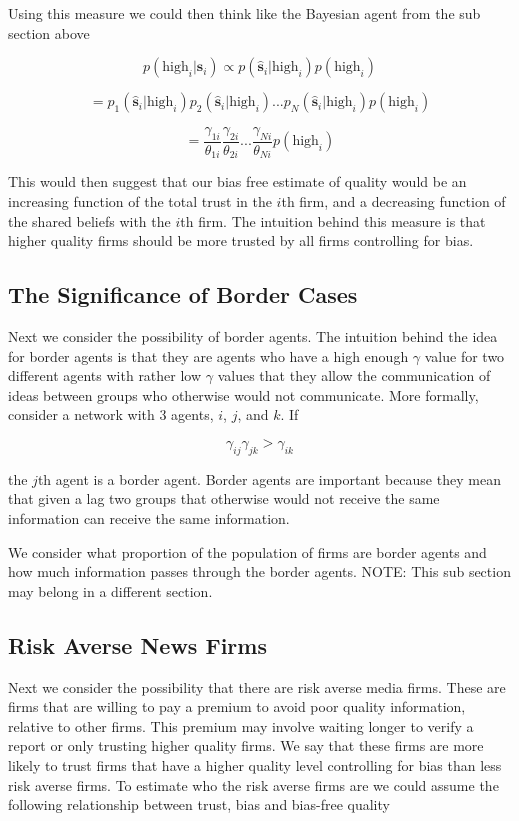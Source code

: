 \documentclass[a4paper]{article}
\begin{document}
Using this measure we could then think like the Bayesian agent from the sub section above

\[p(\text{high}_i|\hat{\textbf{s}}_i) \propto p(\hat{\textbf{s}}_i|\text{high}_i)p(\text{high}_i)\]

\[= p_1(\hat{\textbf{s}}_i|\text{high}_i)p_2(\hat{\textbf{s}}_i|\text{high}_i)...p_N(\hat{\textbf{s}}_i|\text{high}_i)p(\text{high}_i)\]

\[= \frac{\gamma_{1i}}{\theta_{1i}}\frac{\gamma_{2i}}{\theta_{2i}}...\frac{\gamma_{Ni}}{\theta_{Ni}}p(\text{high}_i)\]

This would then suggest that our bias free estimate of quality would be an increasing function of the total trust in the $i$th firm, and a decreasing function of the shared beliefs with the $i$th firm.  The intuition behind this measure is that higher quality firms should be more trusted by all firms controlling for bias.

\subsection{The Significance of Border Cases}

Next we consider the possibility of border agents.  The intuition behind the idea for border agents is that they are agents who have a high enough $\gamma$ value for two different agents with rather low $\gamma$ values that they allow the communication of ideas between groups who otherwise would not communicate.  More formally, consider a network with 3 agents, $i$, $j$, and $k$.  If

\[\gamma_{ij}\gamma_{jk} > \gamma_{ik}\]

the $j$th agent is a border agent.  Border agents are important because they mean that given a lag two groups that otherwise would not receive the same information can receive the same information.

We consider what proportion of the population of firms are border agents and how much information passes through the border agents.  NOTE: This sub section may belong in a different section.

\subsection{Risk Averse News Firms}

Next we consider the possibility that there are risk averse media firms.  These are firms that are willing to pay a premium to avoid poor quality information, relative to other firms.  This premium may involve waiting longer to verify a report or only trusting higher quality firms.  We say that these firms are more likely to trust firms that have a higher quality level controlling for bias than less risk averse firms.  To estimate who the risk averse firms are we could assume the following relationship between trust, bias and bias-free quality
\end{document}
